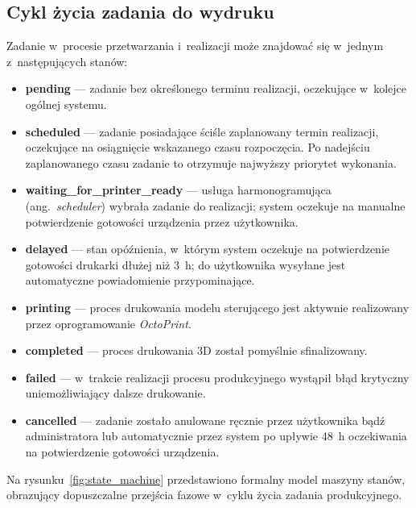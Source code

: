 \documentclass[a4paper,12pt,reqno]{article}
\begin{document}
\subsection{Cykl życia zadania do wydruku}

Zadanie w~procesie przetwarzania i~realizacji może znajdować się w~jednym z~następujących stanów:

\begin{itemize}
	\item \textbf{pending} --- zadanie bez określonego terminu realizacji, oczekujące w~kolejce ogólnej systemu.
	
	\item \textbf{scheduled} --- zadanie posiadające ściśle zaplanowany termin realizacji, oczekujące na osiągnięcie wskazanego czasu rozpoczęcia. Po nadejściu zaplanowanego czasu zadanie to otrzymuje najwyższy priorytet wykonania.
	
	\item \textbf{waiting\_for\_printer\_ready} --- usługa harmonogramująca (ang.~\textit{scheduler}) wybrała zadanie do realizacji; system oczekuje na manualne potwierdzenie gotowości urządzenia przez użytkownika.
	
	\item \textbf{delayed} --- stan opóźnienia, w~którym system oczekuje na potwierdzenie gotowości drukarki dłużej niż 3~h; do użytkownika wysyłane jest automatyczne powiadomienie przypominające.
	
	\item \textbf{printing} --- proces drukowania modelu sterującego jest aktywnie realizowany przez oprogramowanie \textit{OctoPrint}.
	
	\item \textbf{completed} --- proces drukowania 3D został pomyślnie sfinalizowany.
	
	\item \textbf{failed} --- w~trakcie realizacji procesu produkcyjnego wystąpił błąd krytyczny uniemożliwiający dalsze drukowanie.
	
	\item \textbf{cancelled} --- zadanie zostało anulowane ręcznie przez użytkownika bądź administratora lub automatycznie przez system po upływie 48~h oczekiwania na potwierdzenie gotowości urządzenia.
\end{itemize}

Na rysunku~\ref{fig:state_machine} przedstawiono formalny model maszyny stanów, obrazujący dopuszczalne przejścia fazowe w~cyklu życia zadania produkcyjnego.
\end{document}
